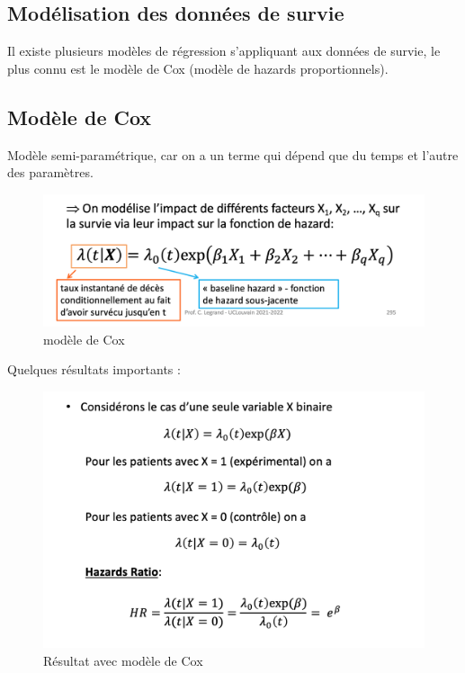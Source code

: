 \subsection{Modélisation des données de survie}
Il existe plusieurs modèles de régression s’appliquant aux données de survie, le plus connu est le modèle de Cox (modèle de hazards proportionnels).

\subsection{Modèle de Cox}
Modèle semi-paramétrique, car on a un terme qui dépend que du temps et l'autre des paramètres.
\begin{figure}[H]
    \centering
    \includegraphics[scale=0.5]{images/modelecox.png}
    \caption{modèle de Cox}
    \label{fig:my_label}
\end{figure}

Quelques résultats importants :

\begin{figure}[H]
    \centering
    \includegraphics[scale=0.5]{images/cox_1.png}
    \caption{Résultat avec modèle de Cox}
    \label{fig:my_label}
\end{figure}

